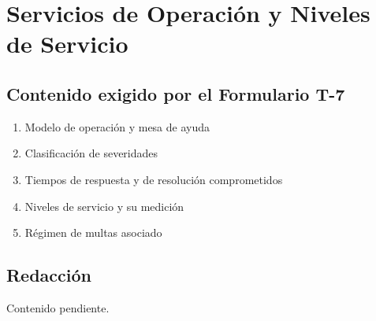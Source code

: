 \section{Servicios de Operación y Niveles de Servicio}

%

\subsection{Contenido exigido por el Formulario T-7}

\begin{enumerate}
    \item Modelo de operación y mesa de ayuda
    \item Clasificación de severidades
    \item Tiempos de respuesta y de resolución comprometidos
    \item Niveles de servicio y su medición
    \item Régimen de multas asociado
\end{enumerate}

\subsection{Redacción}

Contenido pendiente.
